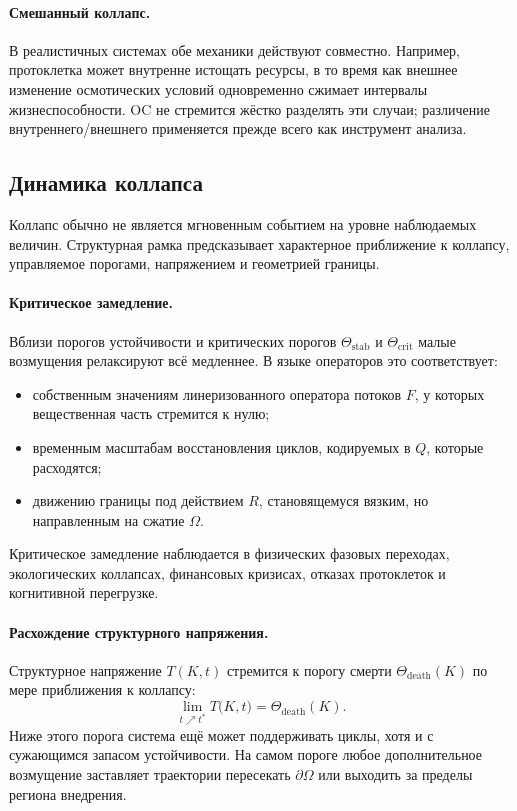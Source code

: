\paragraph{Смешанный коллапс.}
В реалистичных системах обе механики действуют совместно. Например, протоклетка
может внутренне истощать ресурсы, в то время как внешнее изменение
осмотических условий одновременно сжимает интервалы жизнеспособности.
OC не стремится жёстко разделять эти случаи; различение внутреннего/внешнего
применяется прежде всего как инструмент анализа.

\subsection{Динамика коллапса}

Коллапс обычно не является мгновенным событием на уровне наблюдаемых величин.
Структурная рамка предсказывает характерное приближение к коллапсу,
управляемое порогами, напряжением и геометрией границы.

\paragraph{Критическое замедление.}
Вблизи порогов устойчивости и критических порогов
\(\Theta_{\mathrm{stab}}\) и \(\Theta_{\mathrm{crit}}\) малые
возмущения релаксируют всё медленнее. В языке операторов это соответствует:
\begin{itemize}
  \item собственным значениям линеризованного оператора потоков \(F\),
        у которых вещественная часть стремится к нулю;
  \item временным масштабам восстановления циклов, кодируемых в \(Q\),
        которые расходятся;
  \item движению границы под действием \(R\), становящемуся вязким, но
        направленным на сжатие \(\Omega\).
\end{itemize}
Критическое замедление наблюдается в физических фазовых переходах, экологических
коллапсах, финансовых кризисах, отказах протоклеток и когнитивной
перегрузке.

\paragraph{Расхождение структурного напряжения.}
Структурное напряжение \(T(K,t)\) стремится к порогу смерти
\(\Theta_{\mathrm{death}}(K)\) по мере приближения к коллапсу:
\[
  \lim_{t\nearrow t^{\ast}} T\big(K,t\big)
    = \Theta_{\mathrm{death}}(K).
\]
Ниже этого порога система ещё может поддерживать циклы, хотя и с
сужающимся запасом устойчивости. На самом пороге любое дополнительное
возмущение заставляет траектории пересекать \(\partial\Omega\) или выходить
за пределы региона внедрения.

